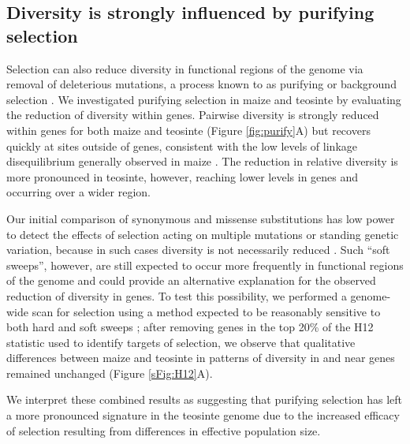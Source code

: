 \documentclass{pnastwo}
\begin{document}
\begin{article}
\subsection{Diversity is strongly influenced by purifying selection}

Selection can also reduce diversity in functional regions of the genome via removal of deleterious mutations, a process known to as purifying or background selection \cite{charlesworth1993}.
We investigated purifying selection in maize and teosinte by evaluating the reduction of diversity within genes.
Pairwise diversity is strongly reduced within genes for both maize and teosinte (Figure \ref{fig:purify}A) but recovers quickly at sites outside of genes, consistent with the low levels of linkage disequilibrium generally observed in maize \cite{tenaillon2002,chia2012}. 
The reduction in relative diversity is more pronounced in teosinte, however, reaching lower levels in genes and occurring over a wider region.  

Our initial comparison of synonymous and missense substitutions has low power to detect the effects of selection acting on multiple mutations or standing genetic variation, because in such cases diversity is not necessarily reduced \cite{innan2004,messer2013}. Such ``soft sweeps'', however, are still expected to occur more frequently in functional regions of the genome and could provide an alternative explanation for the observed reduction of diversity in genes. To test this possibility, we performed a genome-wide scan for selection using a method expected to be reasonably sensitive to both hard and soft sweeps \cite{garud2015}; 
after removing genes in the top 20\% of the H12 statistic used to identify targets of selection, we observe that qualitative differences between maize and teosinte in patterns of diversity in and near genes remained unchanged (Figure \ref{sFig:H12}A).

We interpret these combined results as suggesting that purifying selection has left a more pronounced signature in the teosinte genome due to the increased efficacy of selection resulting from differences in effective population size. 


\end{article}
\end{document}
